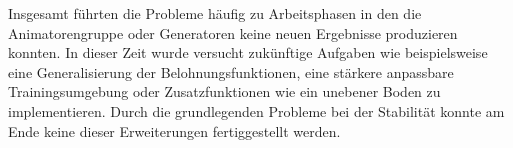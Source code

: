 Insgesamt führten die Probleme häufig zu Arbeitsphasen in den die Animatorengruppe oder Generatoren keine neuen Ergebnisse produzieren konnten. In dieser Zeit wurde versucht zukünftige Aufgaben wie beispielsweise eine Generalisierung der Belohnungsfunktionen, eine stärkere anpassbare Trainingsumgebung oder Zusatzfunktionen wie ein unebener Boden zu implementieren. Durch die grundlegenden Probleme bei der Stabilität konnte am Ende keine dieser Erweiterungen fertiggestellt werden.